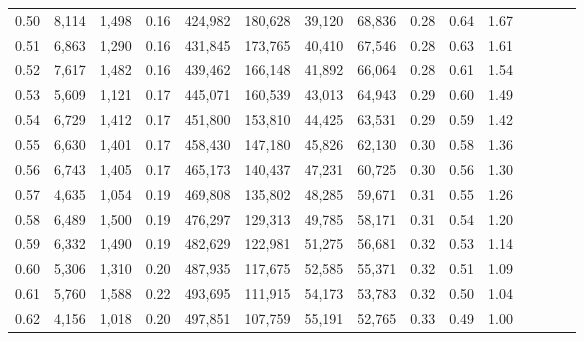 \begin{tabular}{rrrcrrrrrrrrrrr}
0.50 &   8,114 &  1,498 &                                       0.16 &  424,982 &  180,628 &   39,120 &   68,836 &  0.28 &  0.64 &                         1.67 \\
0.51 &   6,863 &  1,290 &                                       0.16 &  431,845 &  173,765 &   40,410 &   67,546 &  0.28 &  0.63 &                         1.61 \\
0.52 &   7,617 &  1,482 &                                       0.16 &  439,462 &  166,148 &   41,892 &   66,064 &  0.28 &  0.61 &                         1.54 \\
0.53 &   5,609 &  1,121 &                                       0.17 &  445,071 &  160,539 &   43,013 &   64,943 &  0.29 &  0.60 &                         1.49 \\
0.54 &   6,729 &  1,412 &                                       0.17 &  451,800 &  153,810 &   44,425 &   63,531 &  0.29 &  0.59 &                         1.42 \\
0.55 &   6,630 &  1,401 &                                       0.17 &  458,430 &  147,180 &   45,826 &   62,130 &  0.30 &  0.58 &                         1.36 \\
0.56 &   6,743 &  1,405 &                                       0.17 &  465,173 &  140,437 &   47,231 &   60,725 &  0.30 &  0.56 &                         1.30 \\
0.57 &   4,635 &  1,054 &                                       0.19 &  469,808 &  135,802 &   48,285 &   59,671 &  0.31 &  0.55 &                         1.26 \\
0.58 &   6,489 &  1,500 &                                       0.19 &  476,297 &  129,313 &   49,785 &   58,171 &  0.31 &  0.54 &                         1.20 \\
0.59 &   6,332 &  1,490 &                                       0.19 &  482,629 &  122,981 &   51,275 &   56,681 &  0.32 &  0.53 &                         1.14 \\
0.60 &   5,306 &  1,310 &                                       0.20 &  487,935 &  117,675 &   52,585 &   55,371 &  0.32 &  0.51 &                         1.09 \\
0.61 &   5,760 &  1,588 &                                       0.22 &  493,695 &  111,915 &   54,173 &   53,783 &  0.32 &  0.50 &                         1.04 \\
0.62 &   4,156 &  1,018 &                                       0.20 &  497,851 &  107,759 &   55,191 &   52,765 &  0.33 &  0.49 &                         1.00 \\

\end{tabular}
